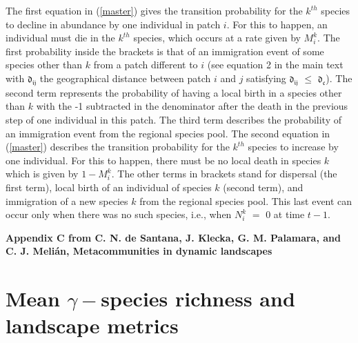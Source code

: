 \documentclass[12pt]{article}
\begin{document}
The first equation in (\ref{master}) gives the transition probability
for the $k^{th}$ species to decline in abundance by one individual in
patch $i$. For this to happen, an individual must die in the $k^{th}$
species, which occurs at a rate given by $M^{k}_{i}$. The first
probability inside the brackets is that of an immigration event of
some species other than $k$ from a patch different to $i$ (see
equation 2 in the main text with $\mathfrak{d_{ij}}$ the geographical
distance between patch $i$ and $j$ satisfying $\mathfrak{d_{ij}}$
$\leq$ $\mathfrak{d_{c}}$). The second term represents the probability
of having a local birth in a species other than $k$ with the -1
subtracted in the denominator after the death in the previous step of
one individual in this patch. The third term describes the probability
of an immigration event from the regional species pool. The second
equation in (\ref{master}) describes the transition probability for
the $k^{th}$ species to increase by one individual. For this to
happen, there must be no local death in species $k$ which is given by
$1 - M^{k}_{i}$. The other terms in brackets stand for dispersal (the
first term), local birth of an individual of species $k$ (second
term), and immigration of a new species $k$ from the regional species
pool. This last event can occur only when there was no such species,
i.e., when $N_{i}^{k}$ $=$ 0 at time $t - 1$.  

\clearpage
\begin{flushleft} 
{\Large \textbf{Appendix C from C. N. de Santana, J. Klecka, G. M. Palamara, and C. J. Meli\'{a}n, Metacommunities in dynamic landscapes}}
\section*{Mean $\gamma-$species richness and landscape metrics}
\end{flushleft}
\renewcommand{\theequation}{C-\arabic{equation}}
\setcounter{equation}{0}
\renewcommand{\thesection}{C\arabic{section}}
\renewcommand{\thefigure}{C\arabic{figure}}
\renewcommand{\thetable}{C\arabic{table}}
\setcounter{figure}{0}
\setcounter{table}{0}
\end{document}
